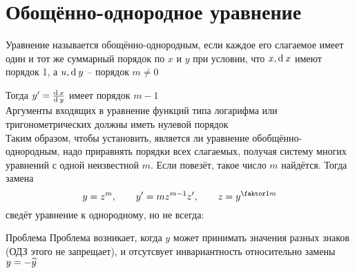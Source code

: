 \section{Обощённо-однородное уравнение}

\begin{definition}
    Уравнение называется обощённо-однородным, если каждое его слагаемое имеет один и тот же суммарный порядок по $ x $ и $ y $ при условии, что $ x, \operatorname{d}^{} x $ имеют порядок 1, а $ u, \operatorname{d}^{} y $ -- порядок $ m \ne 0 $
\end{definition}
Тогда $ y' = \frac{\operatorname{d}^{} x}{\operatorname{d}^{} y} $ имеет порядок $ m - 1 $ \\
Аргументы входящих в уравнение функций типа логарифма или тригонометрических должны иметь нулевой порядок \\
Таким образом, чтобы установить, является ли уравнение обобщённо-однородным, надо приравнять порядки всех слагаемых, получая систему многих уравнений с одной неизвестной $ m $. Если повезёт, такое число $ m $ найдётся. Тогда замена
$$ y = z^m, \qquad y' = mz^{m - 1}z', \qquad z = y^{\faktor1m} $$
сведёт уравнение к однородному, но не всегда:

\begin{undefthm}{Проблема}
    Проблема возникает, когда $ y $ может принимать значения разных знаков (ОДЗ этого не запрещает), и отсутсвует инвариантность относительно замены $ y = -\widetilde{y} $
\end{undefthm}

